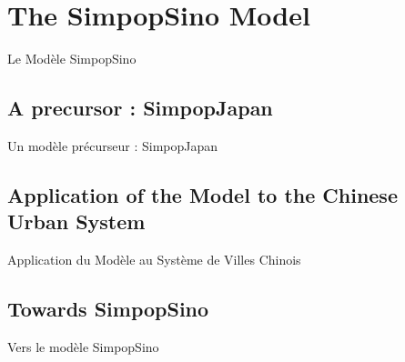 





\section[The SimpopSino Model][Le Modèle SimpopSino]{The SimpopSino Model}{Le Modèle SimpopSino}



\subsection{A precursor : SimpopJapan}{Un modèle précurseur : SimpopJapan}















\subsection{Application of the Model to the Chinese Urban System}{Application du Modèle au Système de Villes Chinois}











\subsection{Towards SimpopSino}{Vers le modèle SimpopSino}








